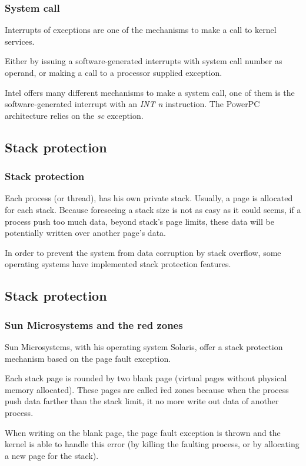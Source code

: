 \begin{frame}
  \frametitle{System call}

Interrupts of exceptions are one of the mechanisms to make a call to kernel services.

\-

Either by issuing a software-generated interrupts with system call number as operand, or making a call to a processor supplied exception. 

\-

Intel offers many different mechanisms to make a system call, one of them is the software-generated interrupt with an \textit{INT n} instruction. The PowerPC architecture relies on the \textit{sc} exception.

\end{frame}


\subsection{Stack protection}

\begin{frame}
  \frametitle{Stack protection}

Each process (or thread), has his own private stack. Usually, a page is allocated for each stack. Because foreseeing a stack size is not as easy as it could seems, if a process push too much data, beyond stack's page limits, these data will be potentially written over another page's data.

\-

In order to prevent the system from data corruption by stack overflow, some operating systems have implemented stack protection features.

\end{frame}


\subsection{Stack protection}

\begin{frame}
  \frametitle{Sun Microsystems and the red zones}

Sun Microsystems, with his operating system Solaris, offer a stack protection mechanism based on the page fault exception.

\-

Each stack page is rounded by two blank page (virtual pages without physical memory allocated). These pages are called \r{red zones} because when the process push data farther than the stack limit, it no more write out data of another process.

\-

When writing on the blank page, the page fault exception is thrown and the kernel is able to handle this error (by killing the faulting process, or by allocating a new page for the stack).

\end{frame}

